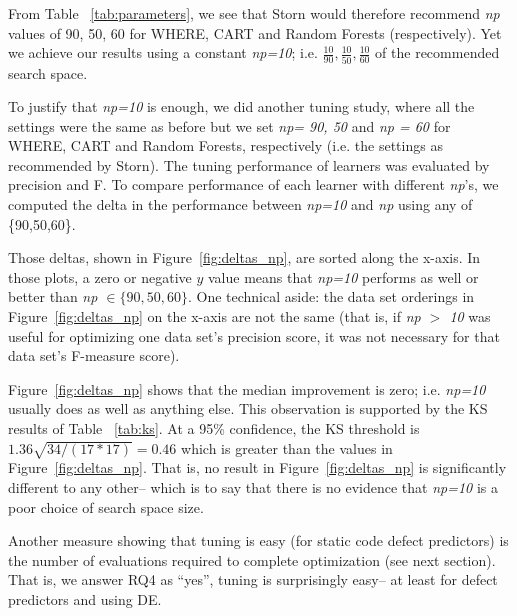 \documentclass{sig-alternative}
\newcommand{\fig}[1]{Figure~\ref{fig:#1}}
\newcommand{\tab}[1]{Table ~\ref{tab:#1}}
\begin{document}
From \tab{parameters},
we see that Storn would therefore recommend {\em np} values of
90, 50, 60 for WHERE, CART and Random Forests (respectively). Yet we achieve our results
using a constant {\em np=10}; i.e. $\frac{10}{90}, \frac{10}{50}, \frac{10}{60}$ of the
recommended search space.

To justify that {\em np=10} is enough, we did another tuning study, 
where all the settings were the same as before but we set {\em np= 90, 50} and {\em np = 60} for WHERE, CART and Random Forests, respectively (i.e. the settings
as recommended by Storn). The tuning performance of learners was evaluated
by precision and F. To compare performance of each learner with different {\em np}'s, we computed the delta in the performance between {\em np=10} and {\em np} using any of \{90,50,60\}.

Those deltas, shown in \fig{deltas_np}, are sorted along the x-axis. In those plots, a zero or negative $y$ value means that {\em np=10} performs as well or better than  {\em np $\in \{90,50,60\}$}. One technical aside: the data set orderings in \fig{deltas_np} on the x-axis are not the same (that is,
if {\em np $>$ 10} was useful for optimizing one data set's precision score, it was not necessary for that data set's F-measure score).

  \fig{deltas_np} shows that
the median improvement is zero; i.e. {\em np=10} usually does as well as anything else. This observation is
supported by the   KS
  results of \tab{ks}. At a 95\% confidence, the
KS threshold  is $1.36\sqrt{34/(17*17)} = 0.46$ which is greater than  the values in \fig{deltas_np}. That is, no result in  \fig{deltas_np} is significantly different to any other-- which is to say that
there is no evidence that   {\em np=10} is a poor choice of search space size.

Another measure showing that tuning is easy 
(for static code defect predictors)
is the number of evaluations required to complete optimization
(see next section). That is, we answer RQ4 as ``yes'', tuning is surprisingly easy-- at least
for defect predictors and using DE.


\end{document}
